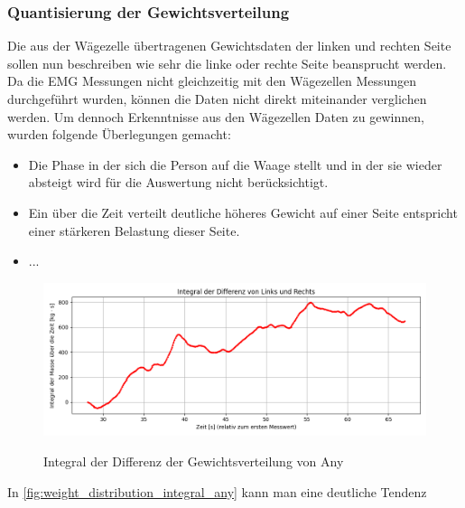 \subsubsection{Quantisierung der Gewichtsverteilung}
Die aus der Wägezelle übertragenen Gewichtsdaten der linken und rechten Seite sollen nun beschreiben wie sehr die linke oder rechte Seite beansprucht werden.
Da die EMG Messungen nicht gleichzeitig mit den Wägezellen Messungen durchgeführt wurden, können die Daten nicht direkt miteinander verglichen werden.
Um dennoch Erkenntnisse aus den Wägezellen Daten zu gewinnen, wurden folgende Überlegungen gemacht:
\begin{itemize}
  \item Die Phase in der sich die Person auf die Waage stellt und in der sie wieder absteigt wird für die Auswertung nicht berücksichtigt.
  \item Ein über die Zeit verteilt deutliche höheres Gewicht auf einer Seite entspricht einer stärkeren Belastung dieser Seite.
  \item ...
\end{itemize}


\begin{figure}
  \centering
  \includegraphics[width=0.8\linewidth]{img/pyplots/Integral der Differenz - Any.png}\\
  \caption{Integral der Differenz der Gewichtsverteilung von Any}
  \label{fig:weight_distribution_integral_any}
\end{figure}

In \autoref{fig:weight_distribution_integral_any} kann man eine deutliche Tendenz


